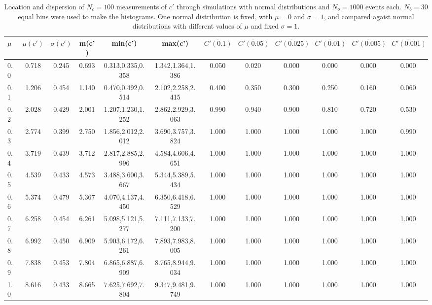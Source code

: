 \begin{table*}[h!]
\begin{center}
\begin{tabular}{| l | c | c | c | c | c | c | c | c | c | c | c |}\hline
$\mu$ & $\mu(c')$ & $\sigma(c')$ & m(c') & min(c') & max(c') & $\overline{C'(0.1)}$ & $\overline{C'(0.05)}$ & $\overline{C'(0.025)}$ & $\overline{C'(0.01)}$ & $\overline{C'(0.005)}$ & $\overline{C'(0.001)}$ \\\hline
0.0 & 0.718 & 0.245 & 0.693 & 0.313,0.335,0.358 & 1.342,1.364,1.386  & 0.050  & 0.020  & 0.000  & 0.000  & 0.000  & 0.000 \\\hline
0.1 & 1.206 & 0.454 & 1.140 & 0.470,0.492,0.514 & 2.102,2.258,2.415  & 0.400  & 0.350  & 0.300  & 0.250  & 0.160  & 0.060 \\\hline
0.2 & 2.028 & 0.429 & 2.001 & 1.207,1.230,1.252 & 2.862,2.929,3.063  & 0.990  & 0.940  & 0.900  & 0.810  & 0.720  & 0.530 \\\hline
0.3 & 2.774 & 0.399 & 2.750 & 1.856,2.012,2.012 & 3.690,3.757,3.824  & 1.000  & 1.000  & 1.000  & 1.000  & 1.000  & 0.990 \\\hline
0.4 & 3.719 & 0.439 & 3.712 & 2.817,2.885,2.996 & 4.584,4.606,4.651  & 1.000  & 1.000  & 1.000  & 1.000  & 1.000  & 1.000 \\\hline
0.5 & 4.539 & 0.433 & 4.573 & 3.488,3.600,3.667 & 5.344,5.389,5.434  & 1.000  & 1.000  & 1.000  & 1.000  & 1.000  & 1.000 \\\hline
0.6 & 5.374 & 0.479 & 5.367 & 4.070,4.137,4.450 & 6.350,6.418,6.529  & 1.000  & 1.000  & 1.000  & 1.000  & 1.000  & 1.000 \\\hline
0.7 & 6.258 & 0.454 & 6.261 & 5.098,5.121,5.277 & 7.111,7.133,7.200  & 1.000  & 1.000  & 1.000  & 1.000  & 1.000  & 1.000 \\\hline
0.8 & 6.992 & 0.450 & 6.909 & 5.903,6.172,6.261 & 7.893,7.983,8.005  & 1.000  & 1.000  & 1.000  & 1.000  & 1.000  & 1.000 \\\hline
0.9 & 7.838 & 0.453 & 7.804 & 6.865,6.887,6.909 & 8.765,8.944,9.034  & 1.000  & 1.000  & 1.000  & 1.000  & 1.000  & 1.000 \\\hline
1.0 & 8.616 & 0.433 & 8.665 & 7.625,7.692,7.804 & 9.347,9.481,9.749  & 1.000  & 1.000  & 1.000  & 1.000  & 1.000  & 1.000 \\\hline
\end{tabular}
\caption{Location and dispersion of $N_c=100$
measurements of $c'$ through simulations
with normal distributions and $N_o=1000$ events each.
$N_b=30$ equal bins were used to make the histograms.
One normal distribution is fixed, with $\mu=0$ and $\sigma=1$,
and compared agaist normal distributions with different values of $\mu$ and fixed $\sigma=1$.}
\end{center}
\end{table*}